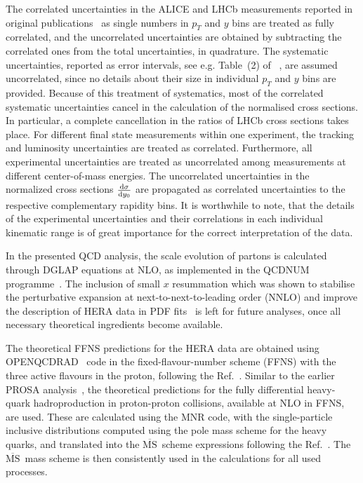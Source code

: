 \documentclass[12pt]{article}
\newcommand{\msbar}{$\overline{\text{MS}}\, $\xspace}
\begin{document}
The correlated uncertainties in the ALICE and LHCb measurements reported in original publications~\cite{Aaij:2016jht, Aaij:2013mga, Aaij:2015bpa, Acharya:2019mgn, Acharya:2017jgo, Aaij:2013noa} as single numbers in $p_T$ and $y$ bins 
are treated as fully correlated, and the uncorrelated uncertainties are obtained by subtracting the correlated ones from the 
total uncertainties, in quadrature. The systematic uncertainties, reported as error intervals, see e.g. Table~(2) of ~\cite{Aaij:2016jht}, are assumed uncorrelated, since no details about their size in individual $p_T$ and $y$ bins are provided. 
Because of this treatment of systematics, most of the correlated systematic uncertainties cancel in the calculation of the normalised cross sections. In particular, a complete cancellation in the ratios of LHCb cross sections takes place.
For different final state measurements within one experiment, the tracking and luminosity uncertainties are treated as correlated. 
Furthermore, all experimental uncertainties are treated as uncorrelated among measurements at different center-of-mass energies. 
The uncorrelated uncertainties in the normalized cross sections $\frac{{\rm d}\sigma}{{\rm d}y_0}$ are propagated as correlated uncertainties to the respective complementary rapidity bins.
It is worthwhile to note, that the details of the experimental uncertainties and their correlations in each individual kinematic range is of great importance for the correct interpretation of the data.

In the presented QCD analysis, the scale evolution of partons is calculated through DGLAP equations at NLO, as implemented in 
the QCDNUM programme~\cite{openqcdrad}.  
The inclusion of small $x$ resummation which was shown to stabilise the perturbative expansion at next-to-next-to-leading order (NNLO) and improve the description of HERA data in PDF fits~\cite{Ball:2017otu,Abdolmaleki:2018jln} is left for future analyses, once all necessary theoretical ingredients become available.

The theoretical FFNS predictions for the HERA data are obtained using OPENQCDRAD~\cite{openqcdrad} code in the 
fixed-flavour-number scheme (FFNS) with the three active flavours in the proton, following the Ref.~\cite{H1:2018flt}. 
Similar to the earlier PROSA analysis~\cite{Zenaiev:2015rfa}, the theoretical predictions for the fully differential 
heavy-quark hadroproduction in proton-proton collisions, available at NLO in FFNS, are used. These are calculated using 
the MNR code, with the single-particle inclusive distributions computed using the pole mass scheme for the heavy quarks, 
and translated into the \msbar scheme expressions following the Ref.~\cite{Dowling:2013baa}. The \msbar mass scheme is 
then consistently used in the calculations for all used processes.
\end{document}
